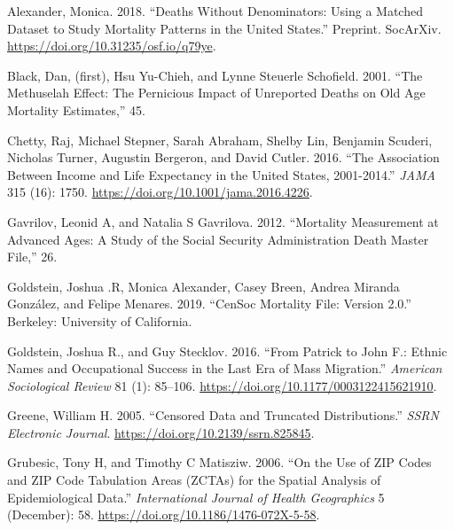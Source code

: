 \documentclass[
  11pt,
]{article}
\newlength{\cslhangindent}
\newlength{\cslentryspacingunit} %
\newenvironment{CSLReferences}[2] %
 {%
  \setlength{\parindent}{0pt}
  \ifodd #1
  \let\oldpar\par
  \def\par{\hangindent=\cslhangindent\oldpar}
  \fi
  \setlength{\parskip}{#2\cslentryspacingunit}
 }%
 {}
\begin{document}
\hypertarget{refs}{}
\begin{CSLReferences}{1}{0}
\leavevmode{}%
Alexander, Monica. 2018. {``Deaths Without Denominators: Using a Matched
Dataset to Study Mortality Patterns in the {United} {States}.''}
Preprint. SocArXiv. \url{https://doi.org/10.31235/osf.io/q79ye}.

\leavevmode{}%
Black, Dan, (first), Hsu Yu-Chieh, and Lynne Steuerle Schofield. 2001.
{``The {Methuselah} {Effect}: {The} {Pernicious} {Impact} of
{Unreported} {Deaths} on {Old} {Age} {Mortality} {Estimates},''} 45.

\leavevmode{}%
Chetty, Raj, Michael Stepner, Sarah Abraham, Shelby Lin, Benjamin
Scuderi, Nicholas Turner, Augustin Bergeron, and David Cutler. 2016.
{``The {Association} {Between} {Income} and {Life} {Expectancy} in the
{United} {States}, 2001-2014.''} \emph{JAMA} 315 (16): 1750.
\url{https://doi.org/10.1001/jama.2016.4226}.

\leavevmode{}%
Gavrilov, Leonid A, and Natalia S Gavrilova. 2012. {``Mortality
{Measurement} at {Advanced} {Ages}: {A} {Study} of the {Social}
{Security} {Administration} {Death} {Master} {File},''} 26.

\leavevmode{}%
Goldstein, Joshua .R, Monica Alexander, Casey Breen, Andrea Miranda
González, and Felipe Menares. 2019. {``{CenSoc} {Mortality} {File}:
{Version} 2.0.''} Berkeley: University of California.

\leavevmode{}%
Goldstein, Joshua R., and Guy Stecklov. 2016. {``From {Patrick} to
{John} {F}.: {Ethnic} {Names} and {Occupational} {Success} in the {Last}
{Era} of {Mass} {Migration}.''} \emph{American Sociological Review} 81
(1): 85--106. \url{https://doi.org/10.1177/0003122415621910}.

\leavevmode{}%
Greene, William H. 2005. {``Censored {Data} and {Truncated}
{Distributions}.''} \emph{SSRN Electronic Journal}.
\url{https://doi.org/10.2139/ssrn.825845}.

\leavevmode{}%
Grubesic, Tony H, and Timothy C Matisziw. 2006. {``On the Use of {ZIP}
Codes and {ZIP} Code Tabulation Areas ({ZCTAs}) for the Spatial Analysis
of Epidemiological Data.''} \emph{International Journal of Health
Geographics} 5 (December): 58.
\url{https://doi.org/10.1186/1476-072X-5-58}.


\end{CSLReferences}
\end{document}
